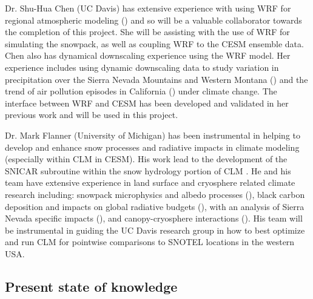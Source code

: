 \documentclass[11pt]{article}
\begin{document}
Dr. Shu-Hua Chen (UC Davis) has extensive experience with using WRF for regional atmospheric modeling (\cite{chen2011observing,xu2014coupling, yang2014evaluating, zhang2014development}) and so will be a valuable collaborator towards the completion of this project. She will be assisting with the use of WRF for simulating the snowpack, as well as coupling WRF to the CESM ensemble data.  Chen also has dynamical downscaling experience using the WRF model. Her experience includes using dynamic downscaling data to study variation in precipitation over the Sierra Nevada Mountains and Western Montana (\cite{pan2011influences, silverman2013dynamically}) and the trend of air pollution episodes in California (\cite{zhao2011impactb, zhao2011impacta}) under climate change. The interface between WRF and CESM has been developed and validated in her previous work and will be used in this project.

Dr. Mark Flanner (University of Michigan) has been instrumental in helping to develop and enhance snow processes and radiative impacts in climate modeling (especially within CLM in CESM).  His work lead to the development of the SNICAR subroutine within the snow hydrology portion of CLM \citep{lawrence2011parameterization,lawrence2012ccsm4}.  He and his team have extensive experience in land surface and cryosphere related climate research including: snowpack microphysics and albedo processes (\cite{flanner2006linking, flanner2011radiative, kuipers2011new}), black carbon deposition and impacts on global radiative budgets (\cite{flanner2007present,mcconnell200720th,flanner2009springtime,flanner2012enhanced,flanner2013arctic,qian2015light}), with an analysis of Sierra Nevada specific impacts (\cite{sterle2013retention}), and canopy-cryosphere interactions (\cite{perket2014diagnosing}).  His team will be instrumental in guiding the UC Davis research group in how to best optimize and run CLM for pointwise comparisons to SNOTEL locations in the western USA. 


\subsection{Present state of knowledge}
\end{document}
